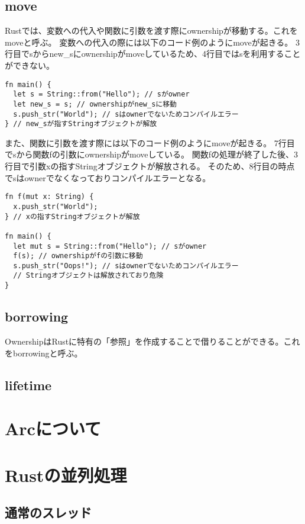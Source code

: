 \documentclass{sumiilab-paper}
\theoremstyle{mystyle}
\numberwithin{definition}{chapter} %
\begin{document}
\subsection{move}
Rustでは、変数への代入や関数に引数を渡す際にownershipが移動する。これをmoveと呼ぶ。
変数への代入の際には以下のコード例のようにmoveが起きる。
3行目でsからnew\_sにownershipがmoveしているため、4行目ではsを利用することができない。
\begin{lstlisting}
fn main() {
  let s = String::from("Hello"); // sがowner
  let new_s = s; // ownershipがnew_sに移動
  s.push_str("World"); // sはownerでないためコンパイルエラー
} // new_sが指すStringオブジェクトが解放    
\end{lstlisting}
また、関数に引数を渡す際には以下のコード例のようにmoveが起きる。
7行目でsから関数fの引数にownershipがmoveしている。
関数fの処理が終了した後、3行目で引数xの指すStringオブジェクトが解放される。
そのため、8行目の時点でsはownerでなくなっておりコンパイルエラーとなる。
\begin{lstlisting}
fn f(mut x: String) {
  x.push_str("World");
} // xの指すStringオブジェクトが解放

fn main() {
  let mut s = String::from("Hello"); // sがowner
  f(s); // ownershipがfの引数に移動
  s.push_str("Oops!"); // sはownerでないためコンパイルエラー
  // Stringオブジェクトは解放されており危険
}
\end{lstlisting}

\subsection{borrowing}
OwnershipはRustに特有の「参照」を作成することで借りることができる。これをborrowingと呼ぶ。

\subsection{lifetime}

\section{Arcについて}

\section{Rustの並列処理}

\subsection{通常のスレッド}
\end{document}
